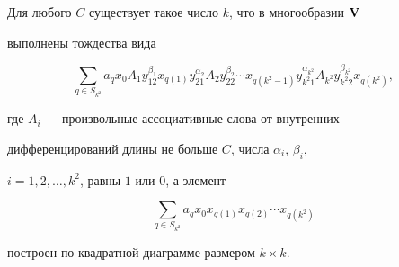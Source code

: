 \begin{lem}


Для любого $C$ существует такое число $k$, что в многообразии $\bold V$


выполнены тождества вида


\begin{equation}


\sum_{q\in S_{k^2}}a_q x_0 A_1 y^{\beta_1}_{12}


x_{q(1)}y^{\alpha_2}_{21}A_2 y^{\beta_2}_{22}\dotsb


x_{q(k^2-1)}y^{\alpha_{k^2}}_{k^2 1}A_{k^2}


y^{\beta_{k^2}}_{k^2 2}x_{q(k^2)},


\end{equation}


где $A_i$ --- произвольные ассоциативные слова от внутренних


дифференцирований длины не больше $C$, числа $\alpha_i$, $\beta_i$,


$i=1,2,\dotsc,k^2$, равны $1$ или $0$, а элемент


\begin{equation}


\sum_{q\in S_{k^2}}a_q x_0 x_{q(1)}x_{q(2)}\dotsb x_{q(k^2)}


\end{equation}


построен по квадратной диаграмме размером $k\times k$.


\end{lem}





